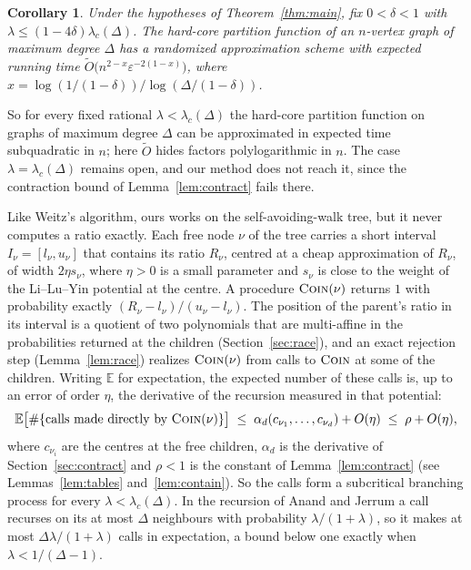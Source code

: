 \documentclass[11pt]{amsart}
\newtheorem{corollary}[theorem]{Corollary}
\newcommand{\lc}{\lambda_c(\Delta)}
\newcommand{\E}{\mathbb{E}}
\newcommand{\nsc}[1]{\textnormal{\textsc{#1}}}
\begin{document}
\begin{corollary}\label{cor:count}
Under the hypotheses of Theorem~\ref{thm:main}, fix $0<\delta<1$ with $\lambda\le(1-4\delta)\lc$. The hard-core partition function of an $n$-vertex graph of maximum degree $\Delta$ has a randomized approximation scheme with expected running time $\tilde O\bigl(n^{2-x}\varepsilon^{-2(1-x)}\bigr)$, where $x=\log(1/(1-\delta))/\log(\Delta/(1-\delta))$.
\end{corollary}

So for every fixed rational $\lambda<\lc$ the hard-core partition function on graphs of maximum degree $\Delta$ can be approximated in expected time subquadratic in $n$; here $\tilde O$ hides factors polylogarithmic in $n$. The case $\lambda=\lc$ remains open, and our method does not reach it, since the contraction bound of Lemma~\ref{lem:contract} fails there.

Like Weitz's algorithm, ours works on the self-avoiding-walk tree, but it never computes a ratio exactly. Each free node $\nu$ of the tree carries a short interval $I_\nu=[l_\nu,u_\nu]$ that contains its ratio $R_\nu$, centred at a cheap approximation of $R_\nu$, of width $2\eta s_\nu$, where $\eta>0$ is a small parameter and $s_\nu$ is close to the weight of the Li--Lu--Yin potential at the centre. A procedure $\nsc{Coin}(\nu)$ returns $1$ with probability exactly $(R_\nu-l_\nu)/(u_\nu-l_\nu)$. The position of the parent's ratio in its interval is a quotient of two polynomials that are multi-affine in the probabilities returned at the children (Section~\ref{sec:race}), and an exact rejection step (Lemma~\ref{lem:race}) realizes $\nsc{Coin}(\nu)$ from calls to $\nsc{Coin}$ at some of the children. Writing $\E$ for expectation, the expected number of these calls is, up to an error of order $\eta$, the derivative of the recursion measured in that potential:
\[
\E\bigl[\#\{\text{calls made directly by }\nsc{Coin}(\nu)\}\bigr]\;\le\;\alpha_d(c_{\nu_1},\dots,c_{\nu_d})+O(\eta)\;\le\;\rho+O(\eta),
\]
where $c_{\nu_i}$ are the centres at the free children, $\alpha_d$ is the derivative of Section~\ref{sec:contract} and $\rho<1$ is the constant of Lemma~\ref{lem:contract} (see Lemmas~\ref{lem:tables} and~\ref{lem:contain}). So the calls form a subcritical branching process for every $\lambda<\lc$. In the recursion of Anand and Jerrum \cite[Section~3.1]{AJ22} a call recurses on its at most $\Delta$ neighbours with probability $\lambda/(1+\lambda)$, so it makes at most $\Delta\lambda/(1+\lambda)$ calls in expectation, a bound below one exactly when $\lambda<1/(\Delta-1)$.
\end{document}
